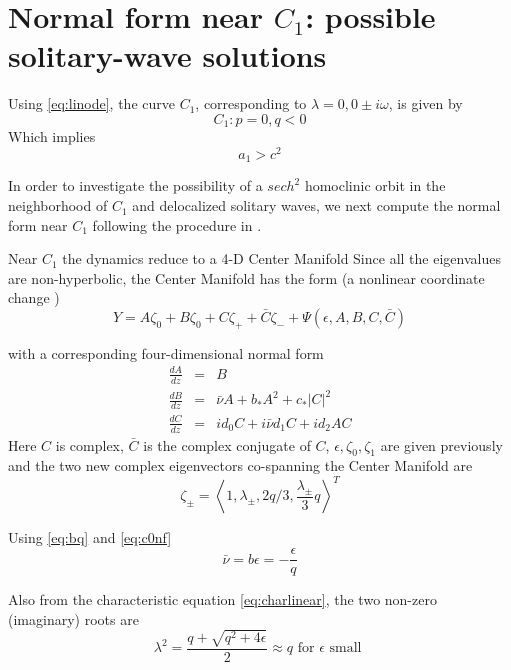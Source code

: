 \section{Normal form near $C_1$: possible solitary-wave solutions}
Using \eqref{eq:linode}, the curve $C_1$, corresponding to $\lambda = 0, 0\pm i \omega$, is given by
\begin{equation}\label{eq:c1}
C_1 : { p = 0, q < 0 }
\end{equation}
Which implies
\begin{equation}
a_1 > c^2
\end{equation}

In order to investigate the possibility of a $ sech^2 $  homoclinic orbit in the neighborhood of $C_1$ and delocalized solitary
waves, we next compute the normal form near $C_1$ following the procedure in \cite{IA}.

Near $C_1$ the dynamics reduce to a 4-D Center Manifold \cite{IA}
Since all the eigenvalues are non-hyperbolic, the Center Manifold has the form (a nonlinear coordinate change \cite{IA})
\begin{equation} \label{eq:c1cm}
Y = A \zeta_0 + B \zeta_0 + C \zeta_+ + \bar{C} \zeta_- + \Psi(\epsilon,A,B,C,\bar{C})
\end{equation}

with  a corresponding four-dimensional normal form
\begin{subequations}\label{eq:c1nf}
\begin{eqnarray}
\frac{dA}{dz} &=& B \\ \label{eq:aq}
\frac{dB}{dz} &=& \bar{\nu} A + b_* A^2 + c_* \left|C\right|^2 \\ \label{eq:bq}
\frac{dC}{dz} &=& i d_0 C + i \bar{\nu} d_1 C + i d_2 A C \label{eq:cq}
\end{eqnarray}
\end{subequations}
Here $C$ is complex, $\bar{C}$ is the complex conjugate of $C$, $\epsilon, \zeta_0, \zeta_1$ are given previously and the two new
complex eigenvectors co-spanning the Center Manifold are
\begin{equation}
\zeta_\pm	 = \left< 1, \lambda_\pm, 2 q / 3, \frac{\lambda_\pm}{3} q\right>^T 
\end{equation}

Using \eqref{eq:bq} and \eqref{eq:c0nf}
\begin{equation}
\bar{\nu} = b \epsilon = -\frac{\epsilon}{q} 
\end{equation}

Also from the characteristic equation \eqref{eq:charlinear}, the two non-zero 
(imaginary) roots are 
\begin{equation}
\lambda^2 = \frac{ q + \sqrt{q^2 + 4 \epsilon } }{2} \approx q \textrm{ for } \epsilon \textrm{ small }
\end{equation}

